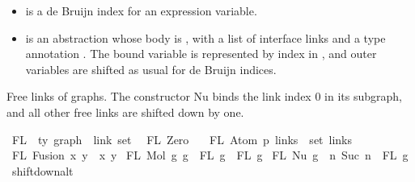 \begin{isabellebody}
\begin{isamarkuptext}
\begin{itemize}
\begin{itemize}
\item {} is a de Bruijn index  for an expression variable.

\item {} is an abstraction whose body is , with a list
of interface links  and a type annotation .  The bound
variable is represented by index  in , and outer variables
are shifted as usual for de Bruijn indices.%
\end{itemize}%
\end{itemize}%
\end{isamarkuptext}\isamarkuptrue%
%
\begin{isamarkuptext}%
Free links of graphs.
The constructor Nu binds the link index 0 in its subgraph,
and all other free links are shifted down by one.%
\end{isamarkuptext}\isamarkuptrue%
\isamarkupfalse%
\ FL\ {\isacharcolon}{\kern0pt}{\isacharcolon}{\kern0pt}\ {\isachardoublequoteopen}{\isacharprime}{\kern0pt}ty\ graph\ {\isacharequal}{\kern0pt}{\isachargreater}{\kern0pt}\ link\ set{\isachardoublequoteclose}\isanewline
{}\isanewline
\ \ {\isachardoublequoteopen}FL\ Zero\ {\isacharequal}{\kern0pt}\ {\isacharbraceleft}{\kern0pt}{\isacharbraceright}{\kern0pt}{\isachardoublequoteclose}\isanewline
{\isacharbar}{\kern0pt}\ {\isachardoublequoteopen}FL\ {\isacharparenleft}{\kern0pt}Atom\ p\ links{\isacharparenright}{\kern0pt}\ {\isacharequal}{\kern0pt}\ set\ links{\isachardoublequoteclose}\isanewline
{\isacharbar}{\kern0pt}\ {\isachardoublequoteopen}FL\ {\isacharparenleft}{\kern0pt}Fusion\ x\ y{\isacharparenright}{\kern0pt}\ {\isacharequal}{\kern0pt}\ {\isacharbraceleft}{\kern0pt}x{\isacharcomma}{\kern0pt}\ y{\isacharbraceright}{\kern0pt}{\isachardoublequoteclose}\isanewline
{\isacharbar}{\kern0pt}\ {\isachardoublequoteopen}FL\ {\isacharparenleft}{\kern0pt}Mol\ g{}\ g{}{\isacharparenright}{\kern0pt}\ {\isacharequal}{\kern0pt}\ FL\ g{}\ {\isasymunion}\ FL\ g{}{\isachardoublequoteclose}\isanewline
{\isacharbar}{\kern0pt}\ {\isachardoublequoteopen}FL\ {\isacharparenleft}{\kern0pt}Nu\ g{\isacharparenright}{\kern0pt}\ {\isacharequal}{\kern0pt}\ {\isacharbraceleft}{\kern0pt}n{\isachardot}{\kern0pt}\ Suc\ n\ {\isasymin}\ FL\ g{\isacharbraceright}{\kern0pt}{\isachardoublequoteclose}\isanewline
\isanewline
\isanewline
{}\isamarkupfalse%
\ shift{\isacharunderscore}{\kern0pt}down{\isacharunderscore}{\kern0pt}alt{\isacharcolon}{\kern0pt}\isanewline

\end{isabellebody}
